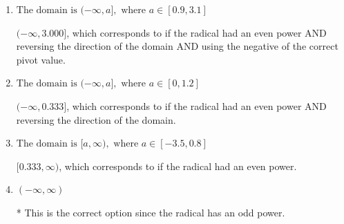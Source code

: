 \documentclass{extbook}[14pt]
\begin{document}
\begin{enumerate}
{\begin{enumerate}[label=\Alph*.]
$[3.000, \infty)$, which corresponds to if the radical had an even power AND using the negative of the correct pivot value.
\item \( \text{The domain is } (-\infty, a], \text{   where } a \in [0.9, 3.1] \)

$(-\infty, 3.000]$, which corresponds to if the radical had an even power AND reversing the direction of the domain AND using the negative of the correct pivot value.
\item \( \text{The domain is } (-\infty, a], \text{   where } a \in [0, 1.2] \)

$(-\infty, 0.333]$, which corresponds to if the radical had an even power AND reversing the direction of the domain.
\item \( \text{The domain is } [a, \infty), \text{   where } a \in [-3.5, 0.8] \)

$[0.333, \infty)$, which corresponds to if the radical had an even power.
\item \( (-\infty, \infty) \)

* This is the correct option since the radical has an odd power.
\end{enumerate}

}
\end{enumerate}
\end{document}

